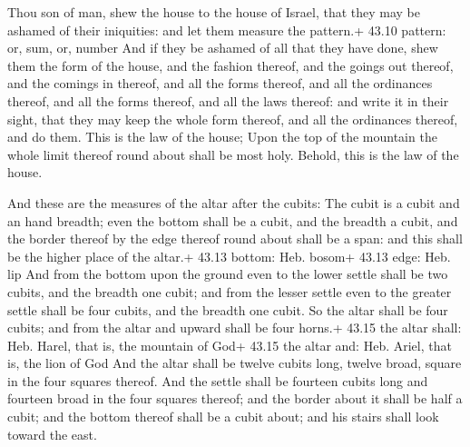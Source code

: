  Thou son of man, shew the house to the house of Israel,
that they may be ashamed of their iniquities: and let them measure the
pattern.+ 43.10 pattern: or, sum, or, number  And if they
be ashamed of all that they have done, shew them the form of the house,
and the fashion thereof, and the goings out thereof, and the comings in
thereof, and all the forms thereof, and all the ordinances thereof, and
all the forms thereof, and all the laws thereof: and write it in their
sight, that they may keep the whole form thereof, and all the ordinances
thereof, and do them.  This is the law of the house; Upon
the top of the mountain the whole limit thereof round about shall be
most holy. Behold, this is the law of the house.

 And these are the measures of the altar after the
cubits: The cubit is a cubit and an hand breadth; even the bottom shall
be a cubit, and the breadth a cubit, and the border thereof by the edge
thereof round about shall be a span: and this shall be the higher place
of the altar.+ 43.13 bottom: Heb. bosom+ 43.13 edge: Heb. lip
 And from the bottom upon the ground even to the lower
settle shall be two cubits, and the breadth one cubit; and from the
lesser settle even to the greater settle shall be four cubits, and the
breadth one cubit.  So the altar shall be four cubits; and
from the altar and upward shall be four horns.+ 43.15 the altar shall:
Heb. Harel, that is, the mountain of God+ 43.15 the altar and: Heb.
Ariel, that is, the lion of God  And the altar shall be
twelve cubits long, twelve broad, square in the four squares thereof.
 And the settle shall be fourteen cubits long and fourteen
broad in the four squares thereof; and the border about it shall be half
a cubit; and the bottom thereof shall be a cubit about; and his stairs
shall look toward the east.

